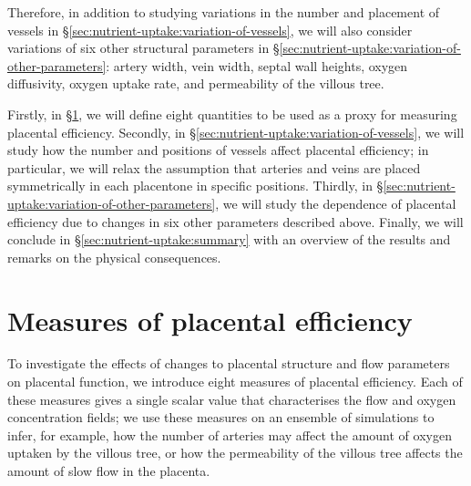     Therefore, in addition to studying variations in the number and placement of vessels in \S\ref{sec:nutrient-uptake:variation-of-vessels}, we will also consider variations of six other structural parameters in \S\ref{sec:nutrient-uptake:variation-of-other-parameters}: artery width, vein width, septal wall heights, oxygen diffusivity, oxygen uptake rate, and permeability of the villous tree.
    
    Firstly, in \S\ref{sec:nutrient-uptake:measures-of-efficiency}, we will define eight quantities to be used as a proxy for measuring placental efficiency. Secondly, in \S\ref{sec:nutrient-uptake:variation-of-vessels}, we will study how the number and positions of vessels affect placental efficiency; in particular, we will relax the assumption that arteries and veins are placed symmetrically in each placentone in specific positions. Thirdly, in \S\ref{sec:nutrient-uptake:variation-of-other-parameters}, we will study the dependence of placental efficiency due to changes in six other parameters described above. Finally, we will conclude in \S\ref{sec:nutrient-uptake:summary} with an overview of the results and remarks on the physical consequences.
    
    \section{Measures of placental efficiency} \label{sec:nutrient-uptake:measures-of-efficiency}
        To investigate the effects of changes to placental structure and flow parameters on placental function, we introduce eight measures of placental efficiency. Each of these measures gives a single scalar value that characterises the flow and oxygen concentration fields; we use these measures on an ensemble of simulations to infer, for example, how the number of arteries may affect the amount of oxygen uptaken by the villous tree, or how the permeability of the villous tree affects the amount of slow flow in the placenta.
        
